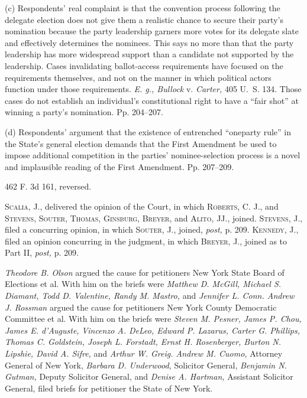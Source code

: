   (c) Respondents' real complaint is that the convention process following the delegate election does not give them a realistic chance to secure their party's nomination because the party leadership garners more votes for its delegate slate and effectively determines the nominees. This says no more than that the party leadership has more widespread support than a candidate not supported by the leadership. Cases invalidating ballot-access requirements have focused on the requirements themselves, and not on the manner in which political actors function under those requirements. \emph{E. g., Bullock} v. \emph{Carter,} 405 U.~S. 134. Those cases do not establish an individual's constitutional right to have a ``fair shot'' at winning a party's nomination. Pp. 204--207.

  (d) Respondents' argument that the existence of entrenched ``oneparty rule'' in the State's general election demands that the First Amendment be used to impose additional competition in the parties' nominee-selection process is a novel and implausible reading of the First Amendment. Pp. 207--209.

462 F. 3d 161, reversed.

\textsc{Scalia,} J., delivered the opinion of the Court, in which \textsc{Roberts,} C. J., and \textsc{Stevens, Souter, Thomas, Ginsburg, Breyer,} and \textsc{Alito,} JJ., joined. \textsc{Stevens,} J., filed a concurring opinion, in which \textsc{Souter,} J., joined, \emph{post,} p. 209. \textsc{Kennedy,} J., filed an opinion concurring in the judgment, in which \textsc{Breyer,} J., joined as to Part II, \emph{post,} p. 209.

  \emph{Theodore B. Olson} argued the cause for petitioners New York State Board of Elections et al. With him on the briefs were \emph{Matthew D. McGill, Michael S. Diamant, Todd D. Valentine, Randy M. Mastro,} and \emph{Jennifer L. Conn. Andrew J. Rossman} argued the cause for petitioners New York County Democratic Committee et al. With him on the briefs were \emph{Steven M. Pesner, James P. Chou, James E. d'Auguste,} \emph{Vincenzo A. DeLeo, Edward P. Lazarus, Carter G. Phillips, Thomas C. Goldstein, Joseph L. Forstadt, Ernst H. Rosenberger, Burton N. Lipshie, David A. Sifre,} and \emph{Arthur W. Greig. Andrew M. Cuomo,} Attorney General of New York, \emph{Barbara D. Underwood,} Solicitor General, \emph{Benjamin N. Gutman,} Deputy Solicitor General, and \emph{Denise A. Hartman,} As\newpage sistant Solicitor General, filed briefs for petitioner the State of New York.

